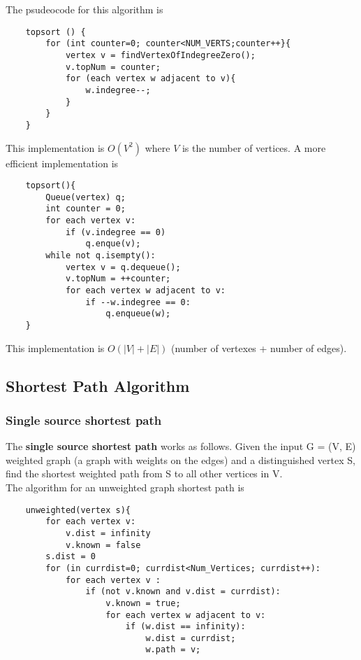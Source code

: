 \documentclass[]{article}
\begin{document}
The psudeocode for this algorithm is 

\begin{lstlisting}
	topsort () {
		for (int counter=0; counter<NUM_VERTS;counter++}{
			vertex v = findVertexOfIndegreeZero();
			v.topNum = counter;
			for (each vertex w adjacent to v){
				w.indegree--;
			}
		}
	}
\end{lstlisting}\bigbreak

This implementation is $O(V^2)$ where $V$ is the number of vertices. A more efficient implementation is

\begin{lstlisting}
	topsort(){
		Queue(vertex) q;
		int counter = 0;
		for each vertex v:
			if (v.indegree == 0)
				q.enque(v);
		while not q.isempty():
			vertex v = q.dequeue();
			v.topNum = ++counter;
			for each vertex w adjacent to v:
				if --w.indegree == 0:
					q.enqueue(w);
	}
\end{lstlisting}\bigbreak

This implementation is $O(|V| + |E|)$ (number of vertexes + number of edges).\\


\subsection{Shortest Path Algorithm}\bigbreak

\subsubsection{Single source shortest path}\bigbreak

The \textbf{single source shortest path} works as follows. Given the input G = (V, E) weighted graph (a graph with weights on the edges) and a distinguished vertex S, find the shortest weighted path from S to all other vertices in V.\\

The algorithm for an unweighted graph shortest path is

\begin{lstlisting}
	unweighted(vertex s){
		for each vertex v:
			v.dist = infinity
			v.known = false
		s.dist = 0
		for (in currdist=0; currdist<Num_Vertices; currdist++):
			for each vertex v :
				if (not v.known and v.dist = currdist):
					v.known = true;
					for each vertex w adjacent to v:
						if (w.dist == infinity):
							w.dist = currdist;
							w.path = v;	
\end{lstlisting}\bigbreak
\end{document}

